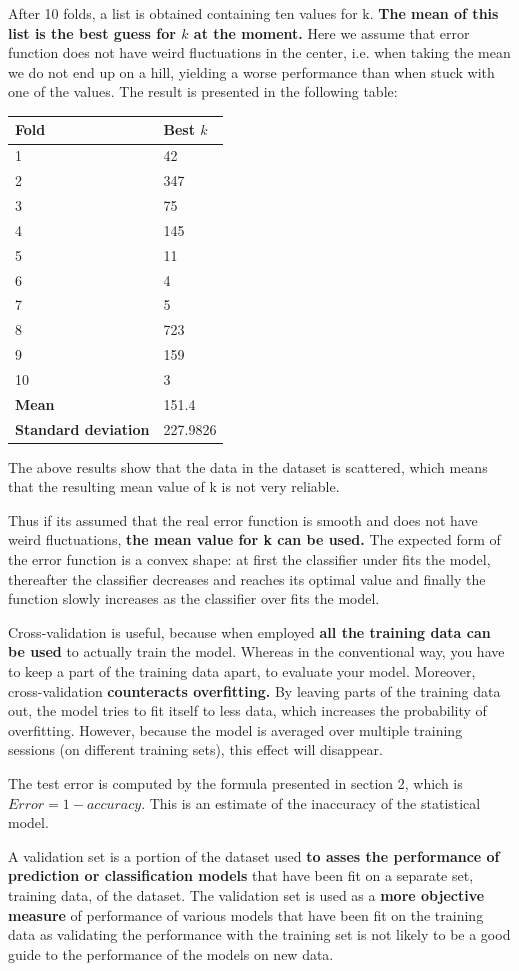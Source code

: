 \documentclass[a4paper]{article}
\begin{document}
After 10 folds, a list is obtained containing ten values for k. \textbf{The mean of this list is the best guess for $k$ at the moment.} Here we assume that error function does not have weird fluctuations in the center, i.e. when taking the mean we do not end up on a hill, yielding a worse performance than when stuck with one of the values. The result is presented in the following table:
\begin{center}
\begin{tabular}{ | l | l | }
\hline
\textbf{Fold} & \textbf{Best $k$}\\
\hline
1 & 42\\
\hline
2 &347\\
\hline
3 & 75\\
\hline
4 & 145\\
\hline
5 & 11\\
\hline
6 & 4\\
\hline
7 & 5\\
\hline
8 & 723\\
\hline
9 & 159\\
\hline
10 & 3\\
\hline
\textbf{Mean} & 151.4\\
\hline
\textbf{Standard deviation} & 227.9826\\
\hline
\end{tabular}
\end{center}
The above results show that the data in the dataset is scattered, which means that the resulting mean value of k is not very reliable.

Thus if its assumed that the real error function is smooth and does not have weird fluctuations, \textbf{the mean value for k can be used.} The expected form of the error function is a convex shape: at first the classifier under fits the model, thereafter the classifier decreases and reaches its optimal value and finally the function slowly increases as the classifier over fits the model.

Cross-validation is useful, because when employed \textbf{all the training data can be used} to actually train the model. Whereas in the conventional way, you have to keep a part of the training data apart, to evaluate your model. Moreover, cross-validation \textbf{counteracts overfitting.} By leaving parts of the training data out, the model tries to fit itself to less data, which increases the probability of overfitting. However, because the model is averaged over multiple training sessions (on different training sets), this effect will disappear.

The test error is computed by the formula presented in section 2, which is $Error = 1 - accuracy$. This is an estimate of the inaccuracy of the statistical model.

A validation set is a portion of the dataset used \textbf{to asses the performance of prediction or classification models} that have been fit on a separate set, training data, of the dataset. The validation set is used as a \textbf{more objective measure} of performance of various models that have been fit on the training data as validating the performance with the training set is not likely to be a good guide to the performance of the models on new data. 
\end{document}
